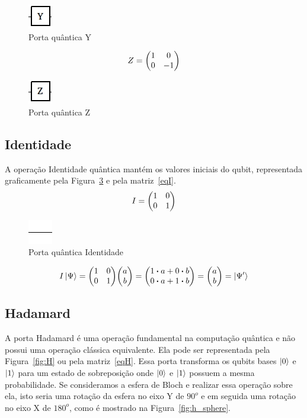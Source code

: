 \documentclass[a4paper, 12pt, oneside]{book}
\begin{document}
\begin{figure}[H]
\centering
\includegraphics[scale=0.75]{y.jpg}
\caption{Porta quântica Y}
\label{fig:y}
\end{figure}

\begin{equation}\label{eqZ}
Z =  \mqty(1&0\\0&-1)
\end{equation}

\begin{figure}[H]
\centering
\includegraphics[scale=0.75]{z.jpg}
\caption{Porta quântica Z}
\label{fig:z}
\end{figure}

\subsection{Identidade} 
A operação Identidade quântica mantém os valores iniciais do qubit, representada graficamente pela Figura~\ref{fig:I} e pela matriz~\eqref{eqI}.
\begin{equation}\label{eqI}
I =  \mqty(1&0\\0&1)
\end{equation}

\begin{figure}[H]
\centering
\includegraphics[scale=0.75]{line.jpg}
\caption{Porta quântica Identidade}
\label{fig:I}
\end{figure}

\begin{align*}
I\ket{\Psi} = \mqty(1&0\\0&1)\mqty(a\\b) = \mqty(1 \vdot a+0 \vdot b \\0 \vdot a+1 \vdot b) = \mqty(a\\b) = \ket{\Psi'}
\end{align*}

\subsection{Hadamard} 
A porta Hadamard é uma operação fundamental na computação quântica e não possui uma operação clássica equivalente. Ela pode ser representada pela Figura~\ref{fig:H} ou pela matriz~\eqref{eqH}. Essa porta transforma os qubits bases $\ket{0}$ e $\ket{1}$ para um estado de sobreposição onde $\ket{0}$ e $\ket{1}$ possuem a mesma probabilidade. Se consideramos a esfera de Bloch e realizar essa operação sobre ela, isto seria uma rotação da esfera no eixo Y de $90^o$ e em seguida uma rotação no eixo X de $180^o$, como é mostrado na Figura~\ref{fig:h_sphere}.
\end{document}
